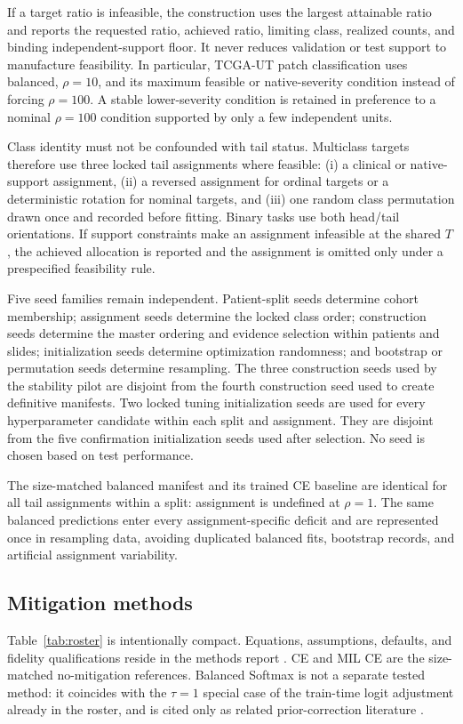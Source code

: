 \documentclass[11pt]{article}
\begin{document}
If a target ratio is infeasible, the construction uses the largest attainable ratio and reports the requested ratio, achieved ratio, limiting class, realized counts, and binding independent-support floor. It never reduces validation or test support to manufacture feasibility. In particular, TCGA-UT patch classification uses balanced, $\rho=10$, and its maximum feasible or native-severity condition instead of forcing $\rho=100$. A stable lower-severity condition is retained in preference to a nominal $\rho=100$ condition supported by only a few independent units.

Class identity must not be confounded with tail status. Multiclass targets therefore use three locked tail assignments where feasible: (i) a clinical or native-support assignment, (ii) a reversed assignment for ordinal targets or a deterministic rotation for nominal targets, and (iii) one random class permutation drawn once and recorded before fitting. Binary tasks use both head/tail orientations. If support constraints make an assignment infeasible at the shared $T$, the achieved allocation is reported and the assignment is omitted only under a prespecified feasibility rule.

Five seed families remain independent. Patient-split seeds determine cohort membership; assignment seeds determine the locked class order; construction seeds determine the master ordering and evidence selection within patients and slides; initialization seeds determine optimization randomness; and bootstrap or permutation seeds determine resampling. The three construction seeds used by the stability pilot are disjoint from the fourth construction seed used to create definitive manifests. Two locked tuning initialization seeds are used for every hyperparameter candidate within each split and assignment. They are disjoint from the five confirmation initialization seeds used after selection. No seed is chosen based on test performance.

The size-matched balanced manifest and its trained CE baseline are identical for all tail assignments within a split: assignment is undefined at $\rho=1$. The same balanced predictions enter every assignment-specific deficit and are represented once in resampling data, avoiding duplicated balanced fits, bootstrap records, and artificial assignment variability.

\subsection{Mitigation methods}
\label{sec:methods}
Table~\ref{tab:roster} is intentionally compact. Equations, assumptions, defaults, and fidelity qualifications reside in the methods report \citep{queisler2026imbalanceMethods}. CE and MIL CE are the size-matched no-mitigation references. Balanced Softmax is not a separate tested method: it coincides with the $\tau=1$ special case of the train-time logit adjustment already in the roster, and is cited only as related prior-correction literature \citep{ren2020balancedMeta}.
\end{document}

